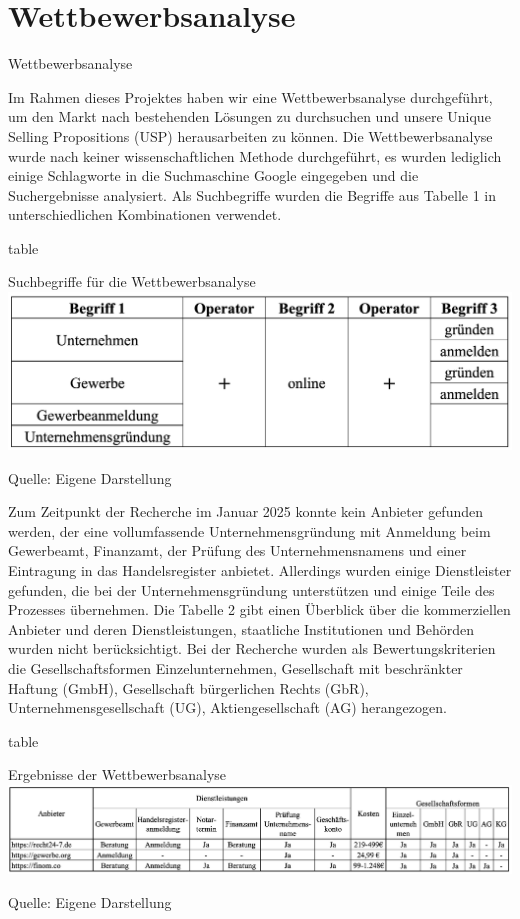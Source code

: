 \newpage

\section{Wettbewerbsanalyse} \label{wettbewerbsanalyse}
Wettbewerbsanalyse

Im Rahmen dieses Projektes haben wir eine Wettbewerbsanalyse durchgeführt, um den Markt nach bestehenden Lösungen zu durchsuchen und unsere Unique Selling Propositions (USP) herausarbeiten zu können. Die Wettbewerbsanalyse wurde nach keiner wissenschaftlichen Methode durchgeführt, es wurden lediglich einige Schlagworte in die Suchmaschine Google eingegeben und die Suchergebnisse analysiert. Als Suchbegriffe wurden die Begriffe aus Tabelle 1 in unterschiedlichen Kombinationen verwendet. 

\caption{table}{Suchbegriffe für die Wettbewerbsanalyse}
\includegraphics{"chapter/chapter_3/Tabelle 1.png"}
\caption{Quelle: Eigene Darstellung}

Zum Zeitpunkt der Recherche im Januar 2025 konnte kein Anbieter gefunden werden, der eine vollumfassende Unternehmensgründung mit Anmeldung beim Gewerbeamt, Finanzamt, der Prüfung des Unternehmensnamens und einer Eintragung in das Handelsregister anbietet. Allerdings wurden einige Dienstleister gefunden, die bei der Unternehmensgründung unterstützen und einige Teile des Prozesses übernehmen. Die Tabelle 2 gibt einen Überblick über die kommerziellen Anbieter und deren Dienstleistungen, staatliche Institutionen und Behörden wurden nicht berücksichtigt. Bei der Recherche wurden als Bewertungskriterien die Gesellschaftsformen Einzelunternehmen, Gesellschaft mit beschränkter Haftung (GmbH), Gesellschaft bürgerlichen Rechts (GbR), Unternehmensgesellschaft (UG), Aktiengesellschaft (AG) herangezogen.

\caption{table}{Ergebnisse der Wettbewerbsanalyse}
\includegraphics{"chapter/chapter_3/Tabelle 2.png"}
\caption{Quelle: Eigene Darstellung}

